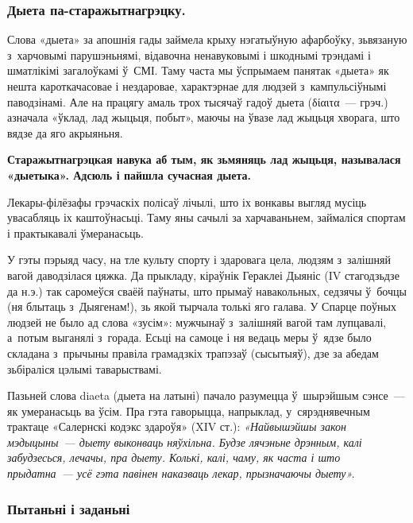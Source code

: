 \subsubsection{Дыета па-старажытнагрэцку.} 

Слова «дыета» за апошнія гады займела крыху нэгатыўную афарбоўку, зьвязаную з~харчовымі парушэньнямі, відавочна ненавуковымі і шкоднымі трэндамі і шматлікімі загалоўкамі ў~СМІ. Таму часта мы ўспрымаем панятак «дыета» як нешта кароткачасовае і нездаровае, характэрнае для людзей з~кампульсіўнымі паводзінамі. Але на працягу амаль трох тысячаў гадоў дыета (δίαιτα~--- грэч.) азначала «ўклад, лад жыцьця, побыт», маючы на ўвазе лад жыцьця хворага, што вядзе да яго акрыяньня. 

\textbf{Старажытнагрэцкая навука аб тым, як зьмяняць лад жыцьця, называлася «дыетыка». Адсюль і пайшла сучасная дыета.}

Лекары-філёзафы грэчаскіх полісаў лічылі, што іх вонкавы выгляд мусіць увасабляць іх каштоўнасьці. Таму яны сачылі за харчаваньнем, займаліся спортам і практыкавалі ўмеранасьць. 


У гэты пэрыяд часу, на тле культу спорту і здаровага цела, людзям з~залішняй вагой даводзілася цяжка. Да прыкладу, кіраўнік Гераклеі Дыяніс (IV стагодзьдзе да н.э.) так саромеўся сваёй паўнаты, што прымаў навакольных, седзячы ў~бочцы (ня блытаць з~Дыягенам!), зь якой тырчала толькі яго галава. У Спарце поўных людзей не было ад слова «зусім»: мужчынаў з~залішняй вагой там лупцавалі, а~потым выганялі з~горада. Есьці на самоце і ня ведаць меры ў~ядзе было складана з~прычыны правіла грамадзкіх трапэзаў (сысытыяў), дзе за абедам зьбіраліся цэлымі таварыствамі.

Пазьней слова diaeta (дыета на латыні) пачало разумецца ў~шырэйшым сэнсе~--- як умеранасьць ва ўсім. Пра гэта гаворыцца, напрыклад, у~сярэднявечным трактаце «Салернскі кодэкс здароўя» (XIV ст.): \emph{«Найвышэйшы закон мэдыцыны~--- дыету выконваць няўхільна. Будзе лячэньне дрэнным, калі забудзесься, лечачы, пра дыету. Колькі, калі, чаму, як часта і што прыдатна~--- усё гэта павінен наказваць лекар, прызначаючы дыету».}


\subsubsection{Пытаньні і заданьні}

